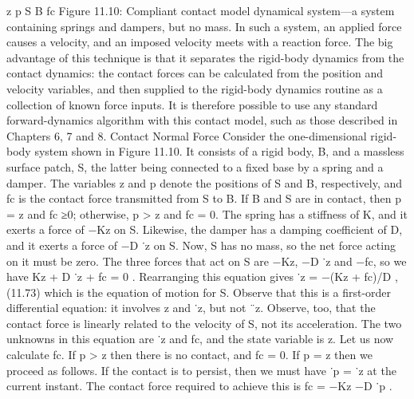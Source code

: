 z p S B fc Figure 11.10: Compliant contact model dynamical system—a system containing springs and dampers, but no mass. In such a system, an applied force causes a velocity, and an imposed velocity meets with a reaction force. The big advantage of this technique is that it separates the rigid-body dynamics from the contact dynamics: the contact forces can be calculated from the position and velocity variables, and then supplied to the rigid-body dynamics routine as a collection of known force inputs. It is therefore possible to use any standard forward-dynamics algorithm with this contact model, such as those described in Chapters 6, 7 and 8. Contact Normal Force Consider the one-dimensional rigid-body system shown in Figure 11.10. It consists of a rigid body, B, and a massless surface patch, S, the latter being connected to a fixed base by a spring and a damper. The variables z and p denote the positions of S and B, respectively, and fc is the contact force transmitted from S to B. If B and S are in contact, then p = z and fc ≥0; otherwise, p > z and fc = 0. The spring has a stiffness of K, and it exerts a force of −Kz on S. Likewise, the damper has a damping coefficient of D, and it exerts a force of −D ˙z on S. Now, S has no mass, so the net force acting on it must be zero. The three forces that act on S are −Kz, −D ˙z and −fc, so we have Kz + D ˙z + fc = 0 . Rearranging this equation gives ˙z = −(Kz + fc)/D , (11.73) which is the equation of motion for S. Observe that this is a first-order differential equation: it involves z and ˙z, but not ¨z. Observe, too, that the contact force is linearly related to the velocity of S, not its acceleration. The two unknowns in this equation are ˙z and fc, and the state variable is z. Let us now calculate fc. If p > z then there is no contact, and fc = 0. If p = z then we proceed as follows. If the contact is to persist, then we must have ˙p = ˙z at the current instant. The contact force required to achieve this is fc = −Kz −D ˙p .

